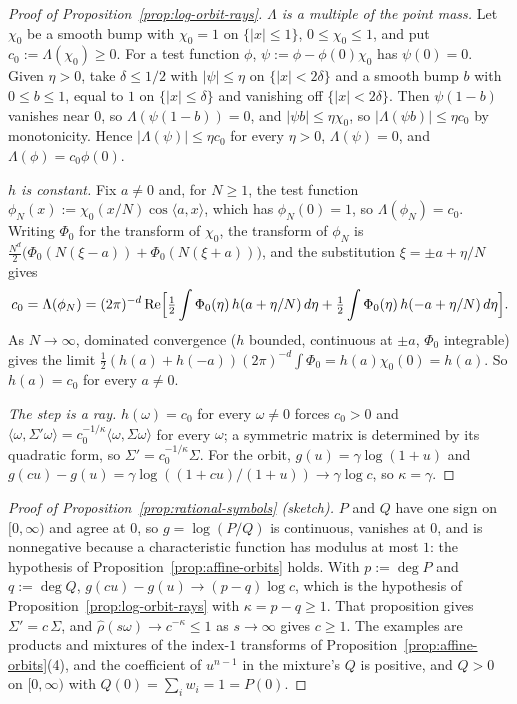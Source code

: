 \begin{proof}[Proof of Proposition~\ref{prop:log-orbit-rays}]
\emph{$\Lambda$ is a multiple of the point mass.} Let $\chi_0$ be a smooth bump with $\chi_0 = 1$ on
$\{|x| \le 1\}$, $0 \le \chi_0 \le 1$, and put $c_0 := \Lambda(\chi_0) \ge 0$. For a test function $\phi$,
$\psi := \phi - \phi(0)\chi_0$ has $\psi(0) = 0$. Given $\eta > 0$, take $\delta \le 1/2$ with
$|\psi| \le \eta$ on $\{|x| < 2\delta\}$ and a smooth bump $b$ with $0 \le b \le 1$, equal to $1$ on
$\{|x| \le \delta\}$ and vanishing off $\{|x| < 2\delta\}$. Then $\psi(1 - b)$ vanishes near $0$, so $\Lambda(\psi(1 - b)) = 0$, and
$|\psi b| \le \eta\chi_0$, so $|\Lambda(\psi b)| \le \eta c_0$ by monotonicity. Hence $|\Lambda(\psi)| \le \eta c_0$
for every $\eta > 0$, $\Lambda(\psi) = 0$, and $\Lambda(\phi) = c_0\phi(0)$.

\emph{$h$ is constant.} Fix $a \ne 0$ and, for $N \ge 1$, the test function
$\phi_N(x) := \chi_0(x/N)\cos\langle a,x\rangle$, which has $\phi_N(0) = 1$, so $\Lambda(\phi_N) = c_0$.
Writing $\Phi_0$ for the transform of $\chi_0$, the transform of $\phi_N$ is
$\frac{N^d}{2}\bigl(\Phi_0(N(\xi - a)) + \Phi_0(N(\xi + a))\bigr)$, and the substitution
$\xi = \pm a + \eta/N$ gives
\[
  c_0 = \Lambda(\phi_N) = (2\pi)^{-d}\,\mathrm{Re}\Bigl[\tfrac12\int\Phi_0(\eta)\,h(a + \eta/N)\,d\eta
    + \tfrac12\int\Phi_0(\eta)\,h(-a + \eta/N)\,d\eta\Bigr] .
\]
As $N \to \infty$, dominated convergence ($h$ bounded, continuous at $\pm a$, $\Phi_0$ integrable) gives
the limit $\tfrac12(h(a) + h(-a))(2\pi)^{-d}\int\Phi_0 = h(a)\chi_0(0) = h(a)$. So $h(a) = c_0$ for every
$a \ne 0$.

\emph{The step is a ray.} $h(\omega) = c_0$ for every $\omega \ne 0$ forces $c_0 > 0$ and
$\langle\omega,\Sigma'\omega\rangle = c_0^{-1/\kappa}\langle\omega,\Sigma\omega\rangle$ for every
$\omega$; a symmetric matrix is determined by its quadratic form, so $\Sigma' = c_0^{-1/\kappa}\Sigma$.
For the \Matern{} orbit, $g(u) = \gamma\log(1+u)$ and $g(cu) - g(u) = \gamma\log((1+cu)/(1+u))
\to \gamma\log c$, so $\kappa = \gamma$.
\end{proof}

\begin{proof}[Proof of Proposition~\ref{prop:rational-symbols} (sketch)]
$P$ and $Q$ have one sign on $[0,\infty)$ and agree at $0$, so $g = \log(P/Q)$ is continuous, vanishes
at $0$, and is nonnegative because a characteristic function has modulus at most $1$: the hypothesis of
Proposition~\ref{prop:affine-orbits} holds. With $p := \operatorname{deg}P$ and $q := \operatorname{deg}Q$,
$g(cu) - g(u) \to (p - q)\log c$, which is the hypothesis of Proposition~\ref{prop:log-orbit-rays} with
$\kappa = p - q \ge 1$. That proposition gives $\Sigma' = c\,\Sigma$, and $\widehat\rho(s\omega) \to
c^{-\kappa} \le 1$ as $s \to \infty$ gives $c \ge 1$. The examples are products and mixtures of the
index-$1$ \Matern{} transforms of Proposition~\ref{prop:affine-orbits}(4), and the coefficient of
$u^{n-1}$ in the mixture's $Q$ is positive, and $Q > 0$ on $[0, \infty)$ with
$Q(0) = \sum_iw_i = 1 = P(0)$.
\end{proof}

